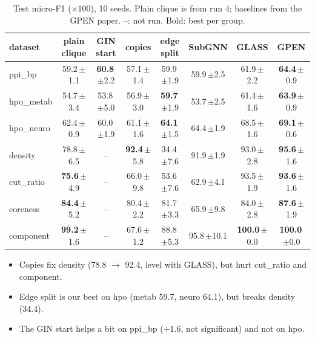 \documentclass[11pt]{article}
\begin{document}
\begin{table}[H]
\centering
\footnotesize
\setlength{\tabcolsep}{3pt}
\begin{tabular}{lcccc|ccc}
\toprule
dataset & plain clique & GIN start & copies & edge split & SubGNN & GLASS & GPEN \\
\midrule
ppi\_bp    & 59.2\,{\scriptsize$\pm$1.1} & \textbf{60.8}\,{\scriptsize$\pm$2.2} & 57.1\,{\scriptsize$\pm$1.4} & 59.9\,{\scriptsize$\pm$1.9} & 59.9\,{\scriptsize$\pm$2.5} & 61.9\,{\scriptsize$\pm$2.2} & \textbf{64.4}\,{\scriptsize$\pm$0.9} \\
hpo\_metab & 54.7\,{\scriptsize$\pm$3.4} & 53.8\,{\scriptsize$\pm$5.0} & 56.9\,{\scriptsize$\pm$3.0} & \textbf{59.7}\,{\scriptsize$\pm$1.9} & 53.7\,{\scriptsize$\pm$2.5} & 61.4\,{\scriptsize$\pm$1.6} & \textbf{63.9}\,{\scriptsize$\pm$0.9} \\
hpo\_neuro & 62.4\,{\scriptsize$\pm$0.9} & 60.0\,{\scriptsize$\pm$1.9} & 61.1\,{\scriptsize$\pm$1.6} & \textbf{64.1}\,{\scriptsize$\pm$1.5} & 64.4\,{\scriptsize$\pm$1.9} & 68.5\,{\scriptsize$\pm$1.6} & \textbf{69.1}\,{\scriptsize$\pm$0.6} \\
density    & 78.8\,{\scriptsize$\pm$6.5} & -- & \textbf{92.4}\,{\scriptsize$\pm$5.8} & 34.4\,{\scriptsize$\pm$7.6} & 91.9\,{\scriptsize$\pm$1.9} & 93.0\,{\scriptsize$\pm$2.8} & \textbf{95.6}\,{\scriptsize$\pm$1.6} \\
cut\_ratio & \textbf{75.6}\,{\scriptsize$\pm$4.9} & -- & 66.0\,{\scriptsize$\pm$9.8} & 53.6\,{\scriptsize$\pm$7.6} & 62.9\,{\scriptsize$\pm$4.1} & 93.5\,{\scriptsize$\pm$1.9} & \textbf{93.6}\,{\scriptsize$\pm$1.6} \\
coreness   & \textbf{84.4}\,{\scriptsize$\pm$5.2} & -- & 80.4\,{\scriptsize$\pm$2.2} & 81.7\,{\scriptsize$\pm$3.3} & 65.9\,{\scriptsize$\pm$9.8} & 84.0\,{\scriptsize$\pm$2.8} & \textbf{87.6}\,{\scriptsize$\pm$1.9} \\
component  & \textbf{99.2}\,{\scriptsize$\pm$1.6} & -- & 67.6\,{\scriptsize$\pm$1.2} & 88.8\,{\scriptsize$\pm$5.3} & 95.8\,{\scriptsize$\pm$10.1} & \textbf{100.0}\,{\scriptsize$\pm$0.0} & \textbf{100.0}\,{\scriptsize$\pm$0.0} \\
\bottomrule
\end{tabular}
\caption{Test micro-F1 ($\times 100$), 10 seeds. Plain clique is from run 4; baselines from the GPEN paper. --: not run. Bold: best per group.}
\label{tab:run5}
\end{table}

\begin{itemize}[itemsep=1pt]
  \item Copies fix density (78.8 $\to$ 92.4, level with GLASS), but hurt cut\_ratio and component.
  \item Edge split is our best on hpo (metab 59.7, neuro 64.1), but breaks density (34.4).
  \item The GIN start helps a bit on ppi\_bp (+1.6, not significant) and not on hpo.
\end{itemize}
\end{document}
